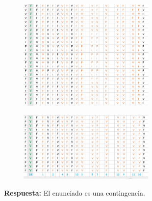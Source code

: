 \documentclass[12pt]{article}
\begin{document}
\begin{enumerate}
                \newpage
                \begin{figure}[!h]
                    \centering
                    \includegraphics[width=0.6\textwidth]{Img/Tarea5_ej1_2.png}
                \end{figure}

                \begin{figure}[!h]
                    \centering
                    \includegraphics[width=0.6\textwidth]{Img/Tarea5_ej1_3.png}
                \end{figure}

                \textbf{Respuesta:} El enunciado es una contingencia.

        \end{enumerate}
\end{document}
